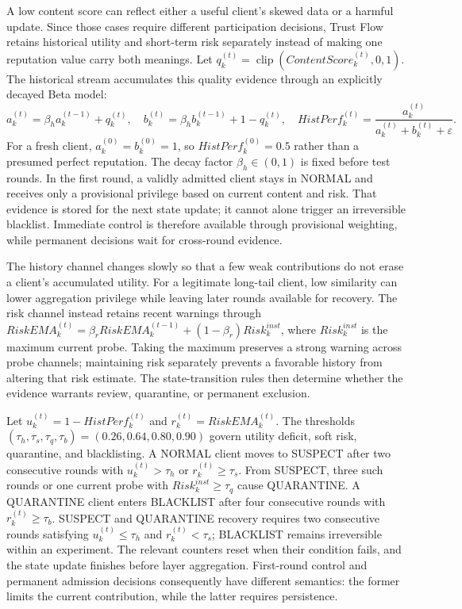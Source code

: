 \documentclass[runningheads,orivec]{llncs}
\begin{document}
A low content score can reflect either a useful client's skewed data or a harmful update. Since those cases require different participation decisions, Trust Flow retains historical utility and short-term risk separately instead of making one reputation value carry both meanings. Let $q_k^{(t)}=\operatorname{clip}(ContentScore_k^{(t)},0,1)$. The historical stream accumulates this quality evidence through an explicitly decayed Beta model:
\begin{equation}
    a_k^{(t)}=\beta_h a_k^{(t-1)}+q_k^{(t)},\quad
    b_k^{(t)}=\beta_h b_k^{(t-1)}+1-q_k^{(t)},\quad
    HistPerf_k^{(t)}=\frac{a_k^{(t)}}{a_k^{(t)}+b_k^{(t)}+\varepsilon}.
\end{equation}
For a fresh client, $a_k^{(0)}=b_k^{(0)}=1$, so $HistPerf_k^{(0)}=0.5$ rather than a presumed perfect reputation. The decay factor $\beta_h\in(0,1)$ is fixed before test rounds. In the first round, a validly admitted client stays in NORMAL and receives only a provisional privilege based on current content and risk. That evidence is stored for the next state update; it cannot alone trigger an irreversible blacklist. Immediate control is therefore available through provisional weighting, while permanent decisions wait for cross-round evidence.

The history channel changes slowly so that a few weak contributions do not erase a client's accumulated utility. For a legitimate long-tail client, low similarity can lower aggregation privilege while leaving later rounds available for recovery. The risk channel instead retains recent warnings through $RiskEMA_k^{(t)}=\beta_rRiskEMA_k^{(t-1)}+(1-\beta_r)Risk_k^{inst}$, where $Risk_k^{inst}$ is the maximum current probe. Taking the maximum preserves a strong warning across probe channels; maintaining risk separately prevents a favorable history from altering that risk estimate. The state-transition rules then determine whether the evidence warrants review, quarantine, or permanent exclusion.

Let $u_k^{(t)}=1-HistPerf_k^{(t)}$ and $r_k^{(t)}=RiskEMA_k^{(t)}$. The thresholds $(\tau_h,\tau_s,\tau_q,\tau_b)=(0.26,0.64,0.80,0.90)$ govern utility deficit, soft risk, quarantine, and blacklisting. A NORMAL client moves to SUSPECT after two consecutive rounds with $u_k^{(t)}>\tau_h$ or $r_k^{(t)}\geq\tau_s$. From SUSPECT, three such rounds or one current probe with $Risk_k^{inst}\geq\tau_q$ cause QUARANTINE. A QUARANTINE client enters BLACKLIST after four consecutive rounds with $r_k^{(t)}\geq\tau_b$. SUSPECT and QUARANTINE recovery requires two consecutive rounds satisfying $u_k^{(t)}\leq\tau_h$ and $r_k^{(t)}<\tau_s$; BLACKLIST remains irreversible within an experiment. The relevant counters reset when their condition fails, and the state update finishes before layer aggregation. First-round control and permanent admission decisions consequently have different semantics: the former limits the current contribution, while the latter requires persistence.
\end{document}
